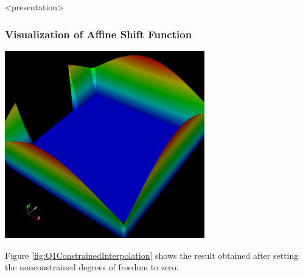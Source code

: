\begin{frame}<presentation>
\frametitle<presentation>{Visualization of Affine Shift Function}
\begin{center}
\includegraphics[width=0.65\textwidth]{./EPS/q1constrainedinterpolate}
\end{center}
\end{frame}

Figure \ref{fig:Q1ConstrainedInterpolation} shows the result obtained
after setting the nonconstrained degrees of freedom to zero.




\cleardoublepage

